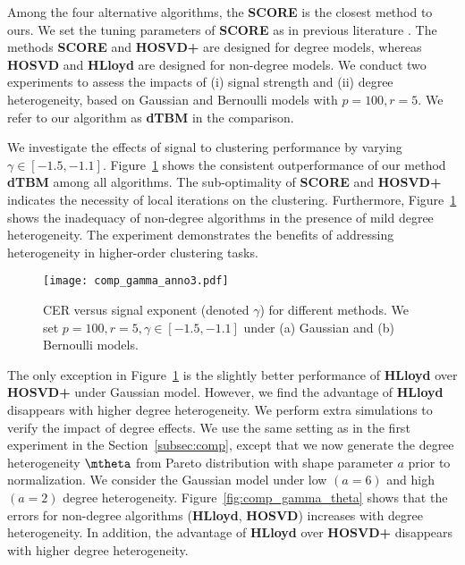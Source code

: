 \documentclass[lettersize,onecolumn,journal]{IEEEtran}
\theoremstyle{definition}
\theoremstyle{definition}
\begin{document}
 Among the four alternative algorithms, the \textbf{\small SCORE} is the closest method to ours.
We set the tuning parameters of \textbf{\small SCORE} as in previous literature \citep{ke2019community}. The methods \textbf{\small SCORE} and \textbf{\small HOSVD+} are designed for degree models, whereas \textbf{\small HOSVD} and \textbf{\small HLloyd} are designed for non-degree models.
We conduct two experiments to assess the impacts of (i) signal strength and (ii) degree heterogeneity, based on Gaussian and Bernoulli models with $ p = 100, r = 5$. We refer to our algorithm as \textbf{\small dTBM} in the comparison. 

We investigate the effects of signal to clustering performance by varying $\gamma \in [-1.5, -1.1]$. Figure~\ref{fig:comp_gamma} shows the consistent outperformance of our method \textbf{\small dTBM} among all algorithms. The sub-optimality of \textbf{\small SCORE} and \textbf{\small HOSVD+} indicates the necessity of local iterations on the clustering. Furthermore,  Figure~\ref{fig:comp_gamma} shows the inadequacy of non-degree algorithms in the presence of mild degree heterogeneity. 
The experiment demonstrates the benefits of addressing heterogeneity in higher-order clustering tasks.   


\begin{figure}[h!]
    \centering
    \texttt{[image: comp\_gamma\_anno3.pdf]}
    \caption{CER versus signal exponent (denoted $\gamma$) for different methods. We set $p = 100, r = 5, \gamma \in [-1.5, -1.1]$ under (a) Gaussian and (b) Bernoulli models.}
    \label{fig:comp_gamma}
\end{figure}


The only exception in Figure~\ref{fig:comp_gamma} is the slightly better performance of \textbf{\small HLloyd} over \textbf{\small HOSVD+} under Gaussian model. However, we find the advantage of \textbf{\small HLloyd} disappears with higher degree heterogeneity. We perform extra simulations to verify the impact of degree effects. We use the same setting as in the first experiment in the Section~\ref{subsec:comp}, except that we now generate the degree heterogeneity $\mtheta$ from Pareto distribution with shape parameter $a$ prior to normalization. We consider the Gaussian model under low $(a = 6)$ and high $(a = 2)$ degree heterogeneity. Figure~\ref{fig:comp_gamma_theta} shows that the errors for non-degree algorithms (\textbf{\small HLloyd}, \textbf{\small HOSVD}) increases with degree heterogeneity. In addition, the advantage of \textbf{\small HLloyd} over \textbf{\small HOSVD+} disappears with higher degree heterogeneity. 
\end{document}
